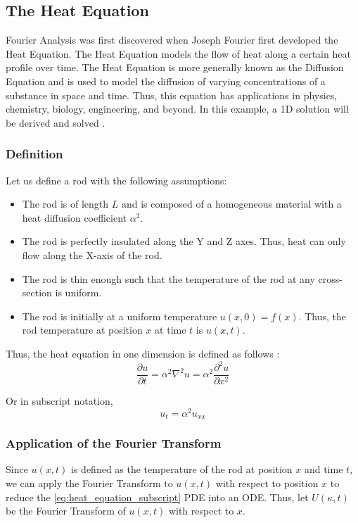 \subsection{The Heat Equation}
Fourier Analysis was first discovered when Joseph Fourier first developed the Heat Equation. 
The Heat Equation models the flow of heat along a certain heat profile over time. 
The Heat Equation is more generally known as the Diffusion Equation and is used to model the diffusion of varying concentrations of a substance in space and time.
Thus, this equation has applications in physics, chemistry, biology, engineering, and beyond.
In this example, a 1D solution will be derived and solved \citep{Sanderson_2019}.

\subsubsection{Definition}
\noindent
Let us define a rod with the following assumptions:
\begin{itemize}
    \item The rod is of length \(L\) and is composed of a homogeneous material with a heat diffusion coefficient \( \alpha^2 \).
    \item The rod is perfectly insulated along the Y and Z axes. Thus, heat can only flow along the X-axis of the rod.
    \item The rod is thin enough such that the temperature of the rod at any cross-section is uniform.
    \item The rod is initially at a uniform temperature \(u(x,0) = f(x)\). Thus, the rod temperature at position \(x\) at time \(t\) is \(u(x,t)\).
\end{itemize}

\noindent
Thus, the heat equation in one dimension is defined as follows \citep{Crawford_2022a}:
\begin{equation} \label{eq:heat_equation}
    \frac{\partial u}{\partial t} = \alpha^2 \nabla^2 u = \alpha^2 \frac{\partial^2 u}{\partial x^2}
\end{equation}

\noindent
Or in subscript notation,
\begin{equation} \label{eq:heat_equation_subscript}
    u_t = \alpha^2 u_{xx}
\end{equation}

\subsubsection{Application of the Fourier Transform}
Since \(u(x,t)\) is defined as the temperature of the rod at position \(x\) and time \(t\), we can apply the Fourier Transform to \(u(x,t)\) with respect to position \(x\) to reduce the \cref{eq:heat_equation_subscript} PDE into an ODE. Thus, let \(U(\kappa,t)\) be the Fourier Transform of \(u(x,t)\) with respect to \(x\).

